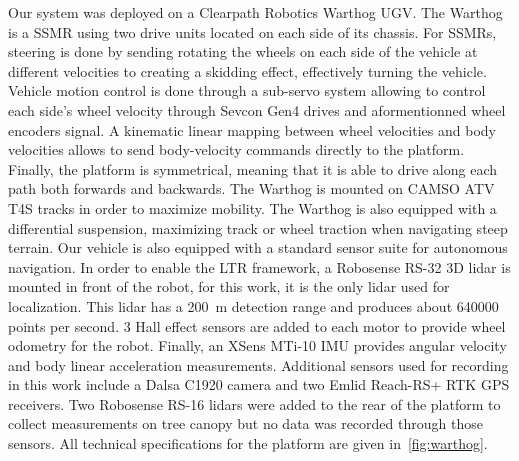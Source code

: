 Our system was deployed on a Clearpath Robotics Warthog \ac{UGV}.
The Warthog is a \ac{SSMR} using two drive units located on each side of its chassis.
For \acp{SSMR}, steering is done by sending rotating the wheels on each side of the vehicle at different velocities to creating a skidding effect, effectively turning the vehicle.
Vehicle motion control is done through a sub-servo system allowing to control each side's wheel velocity through Sevcon Gen4 drives and aformentionned wheel encoders signal.
A kinematic linear mapping between wheel velocities and body velocities allows to send body-velocity commands directly to the platform.
Finally, the platform is symmetrical, meaning that it is able to drive along each path both forwards and backwards.
The Warthog is mounted on CAMSO ATV T4S tracks in order to maximize mobility.
The Warthog is also equipped with a differential suspension, maximizing track or wheel traction when navigating steep terrain.
Our vehicle is also equipped with a standard sensor suite for autonomous navigation.
In order to enable the \ac{LTR} framework, a Robosense RS-32 3D lidar is mounted in front of the robot, for this work, it is the only lidar used for localization.
This lidar has a \SI{200}{m} detection range and produces about \SI{640000}{} points per second.
3 Hall effect sensors are added to each motor to provide wheel odometry for the robot.
Finally, an XSens MTi-10 \ac{IMU} provides angular velocity and body linear acceleration measurements.
Additional sensors used for recording in this work include a Dalsa C1920 camera and two Emlid Reach-RS+ \ac {RTK} \ac{GPS} receivers.
Two Robosense RS-16 lidars were added to the rear of the platform to collect measurements on tree canopy but no data was recorded through those sensors.
All technical specifications for the platform are given in~\autoref{fig:warthog}.

